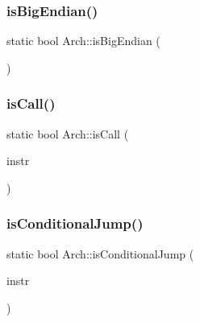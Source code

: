 \mbox{\label{classArch_a580b03c8503aa94ed44905e2f525c6fb}} 
\subsubsection{\texorpdfstring{is\+Big\+Endian()}{isBigEndian()}}
{\footnotesize\ttfamily static bool Arch\+::is\+Big\+Endian (\begin{DoxyParamCaption}{ }\end{DoxyParamCaption})\hspace{0.3cm}{\ttfamily [static]}}

\mbox{\label{classArch_a48a567260b0b9213386f2d1826f8e21c}} 
\subsubsection{\texorpdfstring{is\+Call()}{isCall()}}
{\footnotesize\ttfamily static bool Arch\+::is\+Call (\begin{DoxyParamCaption}\item[{const \hyperlink{classObjdumpInstruction}{Objdump\+Instruction} \&}]{instr }\end{DoxyParamCaption})\hspace{0.3cm}{\ttfamily [static]}}

\mbox{\label{classArch_a4384bfd7646ca7e0c945d6fb3b36db6f}} 
\subsubsection{\texorpdfstring{is\+Conditional\+Jump()}{isConditionalJump()}}
{\footnotesize\ttfamily static bool Arch\+::is\+Conditional\+Jump (\begin{DoxyParamCaption}\item[{const \hyperlink{classObjdumpInstruction}{Objdump\+Instruction} \&}]{instr }\end{DoxyParamCaption})\hspace{0.3cm}{\ttfamily [static]}}

\mbox{\label{classArch_a1ba2bb85ba1f4cb5e7d07506aa21397a}} 
